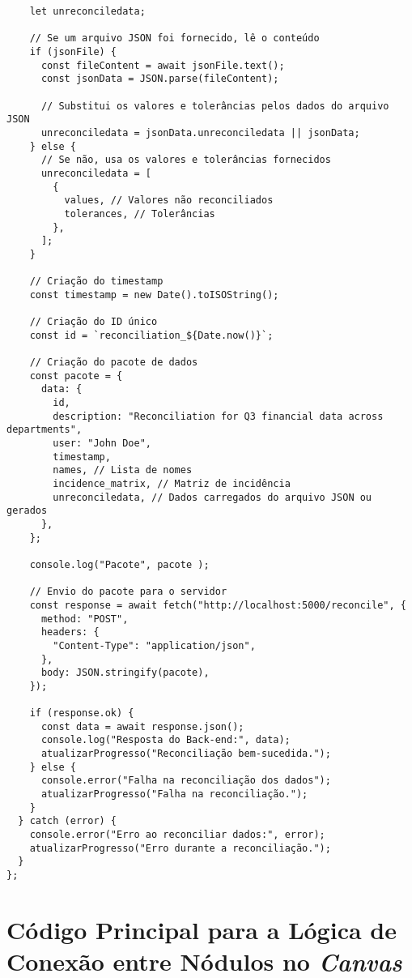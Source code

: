 \begin{verbatim}
    let unreconciledata;

    // Se um arquivo JSON foi fornecido, lê o conteúdo
    if (jsonFile) {
      const fileContent = await jsonFile.text();
      const jsonData = JSON.parse(fileContent);

      // Substitui os valores e tolerâncias pelos dados do arquivo JSON
      unreconciledata = jsonData.unreconciledata || jsonData;
    } else {
      // Se não, usa os valores e tolerâncias fornecidos
      unreconciledata = [
        {
          values, // Valores não reconciliados
          tolerances, // Tolerâncias
        },
      ];
    }

    // Criação do timestamp
    const timestamp = new Date().toISOString();

    // Criação do ID único
    const id = `reconciliation_${Date.now()}`;

    // Criação do pacote de dados
    const pacote = {
      data: {
        id,
        description: "Reconciliation for Q3 financial data across departments",
        user: "John Doe",
        timestamp,
        names, // Lista de nomes
        incidence_matrix, // Matriz de incidência
        unreconciledata, // Dados carregados do arquivo JSON ou gerados
      },
    };

    console.log("Pacote", pacote );

    // Envio do pacote para o servidor
    const response = await fetch("http://localhost:5000/reconcile", {
      method: "POST",
      headers: {
        "Content-Type": "application/json",
      },
      body: JSON.stringify(pacote),
    });

    if (response.ok) {
      const data = await response.json();
      console.log("Resposta do Back-end:", data);
      atualizarProgresso("Reconciliação bem-sucedida.");
    } else {
      console.error("Falha na reconciliação dos dados");
      atualizarProgresso("Falha na reconciliação.");
    }
  } catch (error) {
    console.error("Erro ao reconciliar dados:", error);
    atualizarProgresso("Erro durante a reconciliação.");
  }
};
\end{verbatim}

\chapter{Código Principal para a Lógica de Conexão entre Nódulos no \textit{Canvas}}
\label{Anexo:frontCodeNodeTwoOne}


